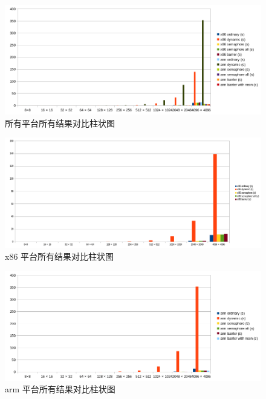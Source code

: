 \documentclass[a4paper]{article}
\begin{document}
\begin{figure}[h]
  \centering
  \includegraphics[width=\textwidth]{all.png}
  \caption{所有平台所有结果对比柱状图}
  \label{pic:all}
\end{figure}

\begin{figure}[h]
  \centering
  \includegraphics[width=\textwidth]{x86.png}
  \caption{x86 平台所有结果对比柱状图}
  \label{pic:x86}
\end{figure}

\begin{figure}[h]
  \centering
  \includegraphics[width=\textwidth]{arm.png}
  \caption{arm 平台所有结果对比柱状图}
  \label{pic:arm}
\end{figure}
\end{document}
